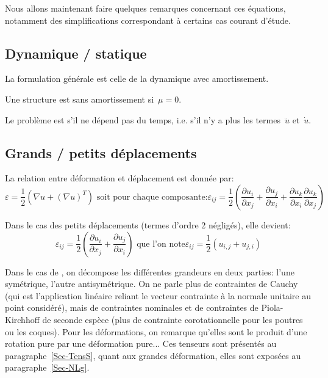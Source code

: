 \medskip
Nous allons maintenant faire quelques remarques concernant ces équations,
notamment des simplifications correspondant à certains cas courant d'étude.

\medskip
\subsection{Dynamique / statique}
La formulation générale est celle de la dynamique avec amortissement.

Une structure est sans amortissement si~$\mu=0$.

Le problème est  s'il ne dépend pas du temps,
i.e. s'il n'y a plus les termes~$\ddot{u}$ et~$\dot{u}$.

\medskip
\subsection{Grands / petits déplacements}
La relation entre déformation et déplacement est donnée par:
\begin{equation}\varepsilon=\frac12\left(\nabla u+(\nabla u)^T\right)%
\text{ soit pour chaque composante:}
\varepsilon_{ij}=\frac12\left(\frac{\partial u_i}{\partial x_j}+\frac{\partial u_j}{\partial x_i}
+\frac{\partial u_k}{\partial x_i}\frac{\partial u_k}{\partial x_j}
\right)\end{equation}

\medskip
Dans le cas des petits déplacements (termes d'ordre 2 négligés), elle devient:
\begin{equation}
\varepsilon_{ij}=\frac12\left(\frac{\partial u_i}{\partial x_j}+\frac{\partial u_j}{\partial x_i}\right)
\text{ que l'on note}
\varepsilon_{ij}=\frac12(u_{i,j}+u_{j,i})
\end{equation}

Dans le cas de , on décompose les différentes grandeurs
en deux parties: l'une symétrique, l'autre antisymétrique.
On ne parle plus de contraintes de Cauchy (qui est l'application linéaire reliant le
vecteur contrainte à la normale unitaire au point considéré), mais
de contraintes nominales et de contraintes de Piola-Kirchhoff de seconde espèce (plus
de contrainte corotationnelle pour les poutres ou les coques).
Pour les déformations, on remarque qu'elles sont le produit d'une rotation pure
par une déformation pure... 
Ces tenseurs sont présentés au paragraphe~\ref{Sec-TensS}, quant
aux grandes déformation, elles sont exposées au paragraphe~\ref{Sec-NLg}.

